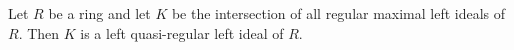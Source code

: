 Let $R$ be a ring and let $K$ be the intersection of all regular maximal left ideals of $R$. Then $K$ is a left quasi-regular left ideal of $R$.
